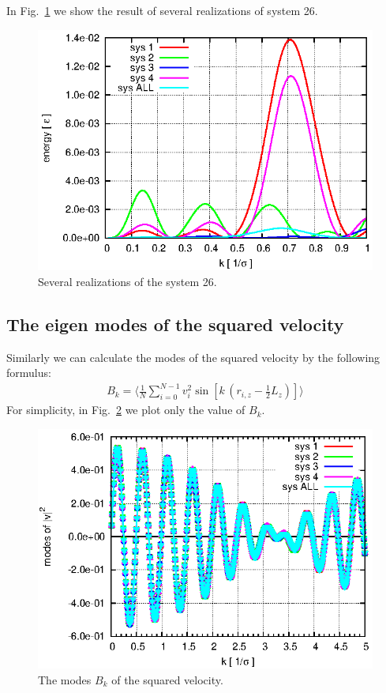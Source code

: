 \documentclass[aip,jcp,a4paper,reprint,onecolumn]{revtex4-1}
\begin{document}
In Fig.~\ref{fig:tmp3} we show the result of several realizations of system 26.
\begin{figure}
  \centering
  \includegraphics[]{fig/fig-compare.eps}
  \caption{Several realizations of the system 26.}
  \label{fig:tmp3}
\end{figure}

\subsection{The eigen modes of the squared velocity}

Similarly we can calculate the modes of the squared velocity by the
following formulus:
\begin{align}
  B_k =\bigg\langle \frac 1N \sum_{i=0}^{N-1} v^2_{i} \sin[k\, (r_{i,z} - \frac12 L_z)]\bigg\rangle
\end{align}
For simplicity, in Fig.~\ref{fig:tmp2} we plot only the value of $B_k$.
\begin{figure}
  \centering
  \includegraphics[]{fig/fig-compare-mode2.eps}
  \caption{The modes $B_k$ of the squared velocity.}
  \label{fig:tmp2}
\end{figure}
\end{document}
